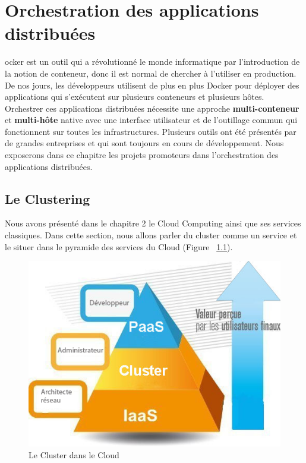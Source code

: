 \chapter{Orchestration des applications distribuées}
\begin{onehalfspace}

ocker est un outil qui a révolutionné le monde informatique par l'introduction de la notion de conteneur, donc il est normal de chercher à l'utiliser en production. De nos jours, les développeurs utilisent de plus en plus Docker pour déployer des applications qui s’exécutent sur plusieurs conteneurs et plusieurs hôtes. Orchestrer ces applications distribuées nécessite une approche \textbf{multi-conteneur} et \textbf{multi-hôte} native avec une interface utilisateur et de l'outillage commun qui fonctionnent sur toutes les infrastructures. Plusieurs outils ont été présentés par de grandes entreprises et qui sont toujours en cours de développement. Nous exposerons dans ce chapitre les projets promoteurs dans l'orchestration des applications distribuées.

\newpage

\section{Le Clustering}


Nous avons présenté dans le chapitre 2 le Cloud Computing ainsi que ses services classiques. Dans cette section, nous allons parler du cluster comme un service et le situer dans le pyramide des services du Cloud (Figure ~\ref{fig:pyramide-cluster}).

\begin{figure}[H]
\centering
\includegraphics [scale=0.7]{chapitre3/assets/pyramide}
\caption{Le Cluster dans le Cloud}
\label{fig:pyramide-cluster}
\end{figure}


\end{onehalfspace}
